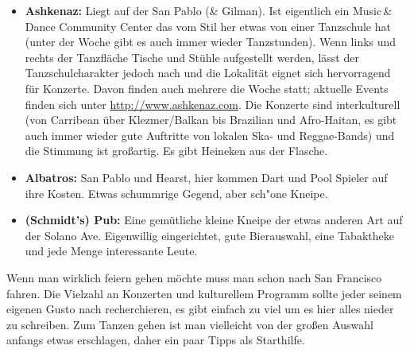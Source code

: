 \documentclass[a4paper]{scrreprt}
\begin{document}
\begin{itemize}
  \item \textbf{Ashkenaz:} Liegt auf der San Pablo (\& Gilman). Ist eigentlich ein Music\,\&\,Dance Community Center das vom Stil her etwas von einer Tanzschule hat (unter der Woche gibt es auch immer wieder Tanzstunden). Wenn links und rechts der Tanzfläche Tische und Stühle aufgestellt werden, lässt der Tanzschulcharakter jedoch nach und die Lokalität eignet sich hervorragend für Konzerte. Davon finden auch mehrere die Woche statt; aktuelle Events finden sich unter \url{http://www.ashkenaz.com}. Die Konzerte sind interkulturell (von Carribean über Klezmer/Balkan bis Brazilian und Afro-Haitan, es gibt auch immer wieder gute Auftritte von lokalen Ska- und Reggae-Bands) und die Stimmung ist großartig. Es gibt Heineken aus der Flasche.
  
  \item \textbf{Albatros:} San Pablo und Hearst, hier kommen Dart und Pool Spieler auf ihre Kosten. Etwas schummrige Gegend, aber sch"one Kneipe.

	\item \textbf{(Schmidt's) Pub:} Eine gemütliche kleine Kneipe der etwas anderen Art auf der Solano Ave. Eigenwillig eingerichtet, gute Bierauswahl, eine Tabaktheke und jede Menge interessante Leute. 

\end{itemize}
  
Wenn man wirklich feiern gehen möchte muss man schon nach San Francisco fahren. Die Vielzahl an Konzerten und kulturellem Programm sollte jeder seinem eigenen Gusto nach recherchieren, es gibt einfach zu viel um es hier alles nieder zu schreiben. Zum Tanzen gehen ist man vielleicht von der großen Auswahl anfangs etwas erschlagen, daher ein paar Tipps als Starthilfe.
\end{document}
